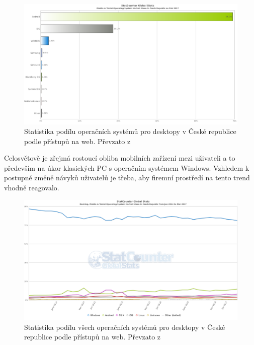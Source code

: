  \begin{figure}[h]
\includegraphics[width=13cm]{img/StatCounter_MobileBar}
\caption{Statistika podílu operačních systémů pro desktopy v České republice podle přístupů na web. Převzato z \cite{http://gs.statcounter.com/os-market-share/mobile-tablet/czech-republic/}} 
\centering
\end{figure}
 
Celosvětově je zřejmá rostoucí obliba mobilních zařízení mezi uživateli a to především na úkor klasických PC s operačním systémem Windows. Vzhledem k postupné změně návyků uživatelů je třeba, aby firemní prostředí na tento trend vhodně reagovalo. 


\begin{figure}[h]
\includegraphics[width=13cm]{img/StatCounter_VyvojVse}
\caption{Statistika podílu všech operačních systémů pro desktopy v České republice podle přístupů na web. Převzato z \cite{http://gs.statcounter.com/os-market-share/mobile-tablet/czech-republic/}} 
\centering
\end{figure}

